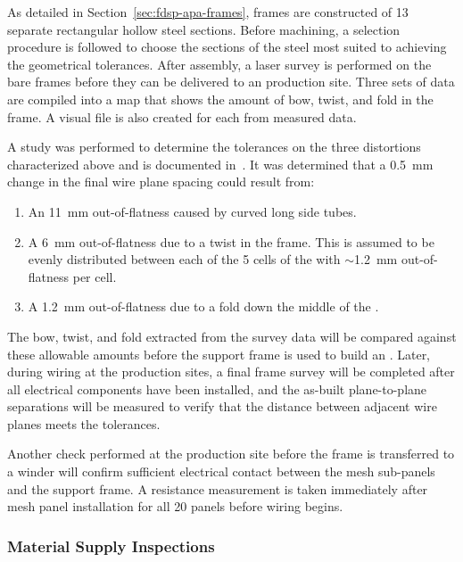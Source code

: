 As detailed in Section~\ref{sec:fdsp-apa-frames},  frames are constructed of 13 separate rectangular hollow steel sections.  Before machining, a selection procedure is followed to choose the sections of the steel most suited to achieving the geometrical tolerances.  After assembly, a laser survey is performed on the bare frames before they can be delivered to an  production site. Three sets of data are compiled into a map that shows the amount of bow, twist, and fold in the frame. A visual file is also created for each  from measured data. 

A study was performed to determine the tolerances on the three distortions characterized above and is documented in~\cite{bib:docdb1300}.  It was determined that a \SI{0.5}{mm} change in the final wire plane spacing could result from:
\begin{enumerate}
\item An \SI{11}{mm} out-of-flatness caused by curved long side tubes.
\item A \SI{6}{mm} out-of-flatness due to a twist in the frame.  This is assumed to be evenly distributed between each of the 5 cells of the  with $\sim$\SI{1.2}{mm} out-of-flatness per cell.
\item A \SI{1.2}{mm} out-of-flatness due to a fold down the middle of the .
\end{enumerate}

The bow, twist, and fold extracted from the survey data will be compared against these allowable amounts before the support frame is used to build an .  Later, during  wiring at the production sites, a final frame survey will be completed after all electrical components have been installed, and the as-built plane-to-plane separations will be measured to verify that the distance between adjacent wire planes meets the tolerances.  

Another check performed at the  production site before the frame is transferred to a winder will confirm sufficient electrical contact between the mesh sub-panels and the  support frame.  A resistance measurement is taken immediately after mesh panel installation for all \num{20} panels before wiring begins.




\subsubsection{Material Supply Inspections}


